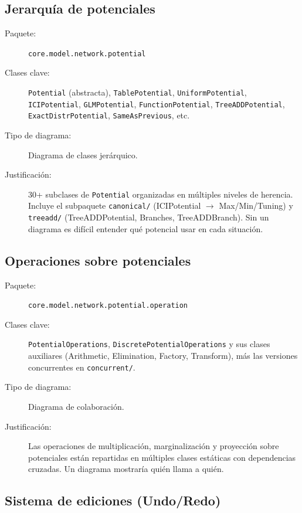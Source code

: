 \documentclass[11pt,a4paper]{article}
\newcommand{\code}[1]{\texttt{#1}}
\newcommand{\pkg}[1]{\texttt{\small #1}}
\begin{document}
\subsection{Jerarqu\'ia de potenciales}

\begin{description}
  \item[Paquete:] \pkg{core.model.network.potential}
  \item[Clases clave:] \code{Potential} (abstracta),
        \code{TablePotential}, \code{UniformPotential},
        \code{ICIPotential}, \code{GLMPotential},
        \code{FunctionPotential}, \code{TreeADDPotential},
        \code{ExactDistrPotential}, \code{SameAsPrevious}, etc.
  \item[Tipo de diagrama:] Diagrama de clases jer\'arquico.
  \item[Justificaci\'on:] 30+ subclases de \code{Potential} organizadas
        en m\'ultiples niveles de herencia.  Incluye el subpaquete
        \code{canonical/} (ICIPotential $\to$ Max/Min/Tuning) y
        \code{treeadd/} (TreeADDPotential, Branches, TreeADDBranch).
        Sin un diagrama es dif\'icil entender qu\'e potencial usar en
        cada situaci\'on.
\end{description}

\subsection{Operaciones sobre potenciales}

\begin{description}
  \item[Paquete:] \pkg{core.model.network.potential.operation}
  \item[Clases clave:] \code{PotentialOperations},
        \code{DiscretePotentialOperations} y sus clases auxiliares
        (Arithmetic, Elimination, Factory, Transform), m\'as las
        versiones concurrentes en \code{concurrent/}.
  \item[Tipo de diagrama:] Diagrama de colaboraci\'on.
  \item[Justificaci\'on:] Las operaciones de multiplicaci\'on,
        marginalizaci\'on y proyecci\'on sobre potenciales est\'an
        repartidas en m\'ultiples clases est\'aticas con dependencias
        cruzadas.  Un diagrama mostrar\'ia qui\'en llama a qui\'en.
\end{description}

\subsection{Sistema de ediciones (Undo/Redo)}
\end{document}
